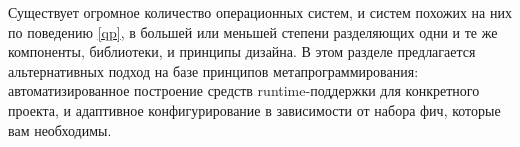 \label{os}\secdown

Существует огромное количество операционных систем, и систем похожих на них по
поведению \ref{qp}, в большей или меньшей степени разделяющих одни и те же
компоненты, библиотеки, и принципы дизайна.
В этом разделе предлагается альтернативных подход на базе принципов
метапрограммирования: автоматизированное построение средств runtime-поддержки
для конкретного проекта, и адаптивное конфигурирование в зависимости от
набора фич, которые вам необходимы.









\secup
